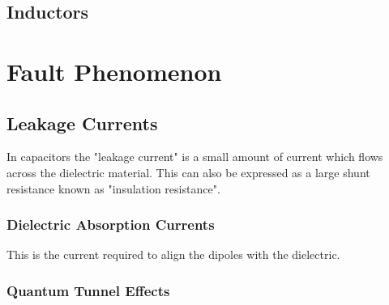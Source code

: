 \documentclass{article}
\begin{document}
	\subsection{Inductors}
	
\newpage

\section{Fault Phenomenon}
	\subsection{Leakage Currents}
	In capacitors the "leakage current" is a small amount of current which flows across the dielectric material. This can also be expressed as a large shunt resistance known as "insulation resistance".
	
	\subsubsection{Dielectric Absorption Currents}
	This is the current required to align the dipoles with the dielectric.
	
	\subsubsection{Quantum Tunnel Effects}


\newpage

\printbibliography
\end{document}
